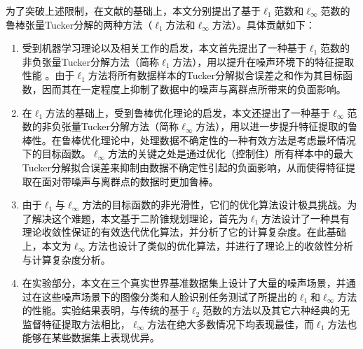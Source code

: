 
为了突破上述限制，在文献的基础上，本文分别提出了基于$\ell_{1}$范数和$\ell_{\infty}$范数的鲁棒张量Tucker分解的两种方法（$\ell_{1}$方法和$\ell_{\infty}$方法）。具体贡献如下：
\begin{enumerate}
    \item 受到机器学习理论以及相关工作的启发，本文首先提出了一种基于$\ell_1$范数的非负张量Tucker分解方法（简称$\ell_1$方法），用以提升在噪声环境下的特征提取性能
    。由于$\ell_{1}$方法将所有数据样本的Tucker分解拟合误差之和作为其目标函数，因而其在一定程度上抑制了数据中的噪声与离群点所带来的负面影响。
    \item 在$\ell_{1}$方法的基础上，受到鲁棒优化理论的启发，本文还提出了一种基于$\ell_\infty$范数的非负张量Tucker分解方法（简称$\ell_\infty$方法），用以进一步提升特征提取的鲁棒性。在鲁棒优化理论中，处理数据不确定性的一种有效方法是考虑最坏情况下的目标函数。$\ell_{\infty}$方法的关键之处是通过优化（控制住）所有样本中的最大Tucker分解拟合误差来抑制由数据不确定性引起的负面影响，从而使得特征提取在面对带噪声与离群点的数据时更加鲁棒。
    \item 由于$\ell_{1}$与$\ell_{\infty}$方法的目标函数的非光滑性，它们的优化算法设计极具挑战。为了解决这个难题，本文基于二阶锥规划理论，首先为$\ell_{1}$方法设计了一种具有理论收敛性保证的有效迭代优化算法，并分析了它的计算复杂度。在此基础上，本文为$\ell_{\infty}$方法也设计了类似的优化算法，并进行了理论上的收敛性分析与计算复杂度分析。
    \item 在实验部分，本文在三个真实世界基准数据集上设计了大量的噪声场景，并通过在这些噪声场景下的图像分类和人脸识别任务测试了所提出的$\ell_{1}$和$\ell_{\infty}$方法的性能。实验结果表明，与传统的基于$\ell_{2}$范数的方法以及其它六种经典的无监督特征提取方法相比，$\ell_{\infty}$方法在绝大多数情况下均表现最佳，而$\ell_{1}$方法也能够在某些数据集上表现优异。
\end{enumerate}



